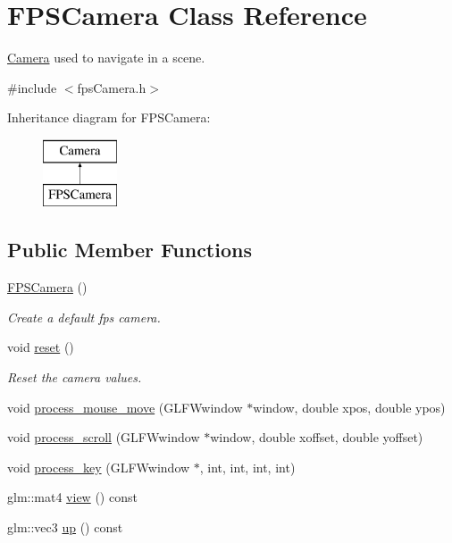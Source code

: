 \hypertarget{classFPSCamera}{}\section{F\+P\+S\+Camera Class Reference}
\label{classFPSCamera}


\hyperlink{classCamera}{Camera} used to navigate in a scene.  




{\ttfamily \#include $<$fps\+Camera.\+h$>$}

Inheritance diagram for F\+P\+S\+Camera\+:\begin{figure}[H]
\begin{center}
\leavevmode
\includegraphics[height=2.000000cm]{classFPSCamera}
\end{center}
\end{figure}
\subsection*{Public Member Functions}
\begin{DoxyCompactItemize}
\item 
\hyperlink{classFPSCamera_a4176f2807be12da32763f66ba55b9621}{F\+P\+S\+Camera} ()
\begin{DoxyCompactList}\small\item\em Create a default fps camera. \end{DoxyCompactList}\item 
void \hyperlink{classFPSCamera_a5076d0c700255c33daff490d73c77761}{reset} ()
\begin{DoxyCompactList}\small\item\em Reset the camera values. \end{DoxyCompactList}\item 
void \hyperlink{classFPSCamera_a3e776ea7816c76d53a0f688c25c4c338}{process\+\_\+mouse\+\_\+move} (G\+L\+F\+Wwindow $\ast$window, double xpos, double ypos)
\item 
void \hyperlink{classFPSCamera_a45640c2e2234cdae4e12bded299e19e8}{process\+\_\+scroll} (G\+L\+F\+Wwindow $\ast$window, double xoffset, double yoffset)
\item 
void \hyperlink{classFPSCamera_a420a19fa966d3a9caceb81a519419780}{process\+\_\+key} (G\+L\+F\+Wwindow $\ast$, int, int, int, int)
\item 
glm\+::mat4 \hyperlink{classFPSCamera_a41a04414a362e7aa866d490900830cb8}{view} () const
\item 
glm\+::vec3 \hyperlink{classFPSCamera_a1b6470a9ebb906bc31a2742b943552a1}{up} () const
\end{DoxyCompactItemize}
